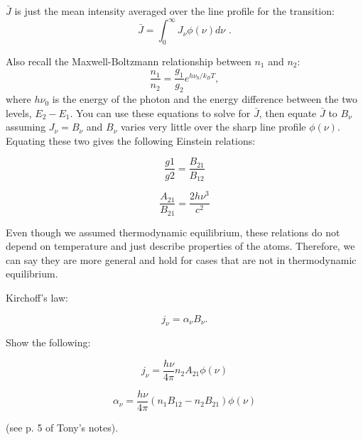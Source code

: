 \begin{enumerate}
       $\bar{J}$ is just the mean intensity averaged over the line profile for the transition:
       \begin{equation}
       \bar{J} = \int^\infty_0 J_\nu \phi(\nu) d\nu \,\,.
       \end{equation}
       
       Also recall the Maxwell-Boltzmann relationship between $n_1$ and $n_2$:
       \begin{equation}
       \frac{n_1}{n_2} = \frac{g_1}{g_2} e^{h\nu_0 / k_B T},
       \end{equation}
       where $h\nu_0$ is the energy of the photon and the energy difference between the two levels, $E_2 - E_1$. You can use these equations to solve for $\bar{J}$, then equate $\bar{J}$ to $B_\nu$ assuming $J_\nu = B_\nu$ and $B_\nu$ varies very little over the sharp line profile $\phi(\nu)$. Equating these two gives the following Einstein relations:
      
      \begin{equation}
      \frac{g1}{g2} = \frac{B_{21}}{B_{12}}
      \end{equation}
      
      \begin{equation}
      \frac{A_{21}}{B_{21}} = \frac{2 h \nu^3}{c^2}
      \end{equation}
      
      Even though we assumed thermodynamic equilibrium, these relations do not depend on temperature and just describe properties of the atoms. Therefore, we can say they are more general and hold for cases that are not in thermodynamic equilibrium.
      
      Kirchoff's law:
      
      \begin{equation}
      j_\nu = \alpha_\nu B_\nu.
      \end{equation}
      
      Show the following:
      
      \begin{equation}
      j_\nu = \frac{h \nu}{4 \pi} n_2 A_{21} \phi(\nu)
      \end{equation}
      
       \begin{equation}
      \alpha_\nu = \frac{h \nu}{4 \pi} (n_1 B_{12} - n_2 B_{21} ) \phi(\nu)
      \end{equation}
      
      (see p. 5 of Tony's notes). 
      

\end{enumerate}
